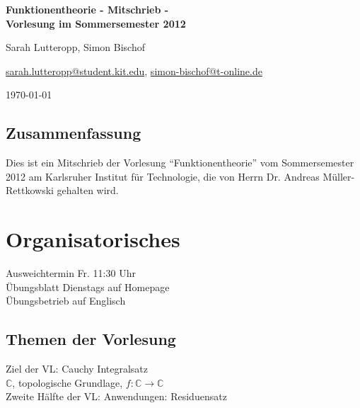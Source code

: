 \documentclass[a4paper,11pt,notitlepage]{report}
\theoremstyle{definition}
\newcommand{\C}{{\ensuremath{\mathbb{C}}}}
\begin{document}
\setcounter{chapter}{0}

\begin{titlepage}
	\begin{center}	
		\LARGE \textbf{{Funktionentheorie - Mitschrieb -} \\[5ex] 
    		{\Large Vorlesung im Sommersemester 2012\\[5ex]}}
	\end{center}
	\begin{center}
		\Large Sarah Lutteropp, Simon Bischof
	\end{center}
	\begin{center}
		\href{mailto:sarah.lutteropp@student.kit.edu}{sarah.lutteropp@student.kit.edu}, 
		\href{mailto:simon-bischof@t-online.de}{simon-bischof@t-online.de}
	\end{center}
	\begin{center}
		\today
	\end{center}
	\vspace{2cm}
	\begin{center}
	\end{center}
\end{titlepage}
\setcounter{tocdepth}{1}
\tableofcontents

\section*{Zusammenfassung}
Dies ist ein Mitschrieb der Vorlesung “Funktionentheorie” vom Sommersemester 2012 am Karlsruher Institut für Technologie, die von Herrn Dr. Andreas Müller-Rettkowski gehalten wird.

\setcounter{chapter}{-1}
\chapter{Organisatorisches}
\setcounter{section}{-1}

Ausweichtermin Fr. 11:30 Uhr\\
Übungsblatt Dienstags auf Homepage\\
Übungsbetrieb auf Englisch

\section{Themen der Vorlesung}
Ziel der VL: Cauchy Integralsatz\\
$\C$, topologische Grundlage, $f \colon \C \rightarrow \C$ \\
Zweite Hälfte der VL: Anwendungen: Residuensatz
\end{document}

